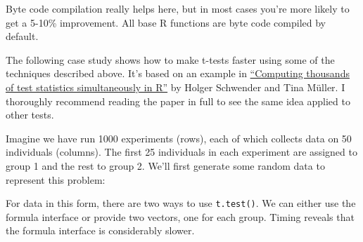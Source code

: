 Byte code compilation really helps here, but in most cases you're more
likely to get a 5-10\% improvement. All base R functions are byte code
compiled by default.


The following case study shows how to make t-tests faster using some of
the techniques described above. It's based on an example in
\href{http://stat-computing.org/newsletter/issues/scgn-18-1.pdf}{``Computing
thousands of test statistics simultaneously in R''} by Holger Schwender
and Tina Müller. I thoroughly recommend reading the paper in full to see
the same idea applied to other tests. 

Imagine we have run 1000 experiments (rows), each of which collects data
on 50 individuals (columns). The first 25 individuals in each experiment
are assigned to group 1 and the rest to group 2. We'll first generate
some random data to represent this problem:

\begin{Shaded}
\begin{Highlighting}[]
\StringTok{ }
\StringTok{ }
\StringTok{ }\NormalTok{(}\StringTok{ } \NormalTok{, } \NormalTok{), } 
\StringTok{ }\NormalTok{(}\NormalTok{:}\NormalTok{, } \StringTok{ }\NormalTok{)}
\end{Highlighting}
\end{Shaded}

For data in this form, there are two ways to use \texttt{t.test()}. We
can either use the formula interface or provide two vectors, one for
each group. Timing reveals that the formula interface is considerably
slower.

\begin{Shaded}
\begin{Highlighting}[]
\StringTok{ }
\NormalTok{(}
  \NormalTok{(X[i, grp ==}\StringTok{ }\NormalTok{], X[i, grp ==}\StringTok{ }\NormalTok{])$stat}
\NormalTok{)}
\end{Highlighting}
\end{Shaded}

